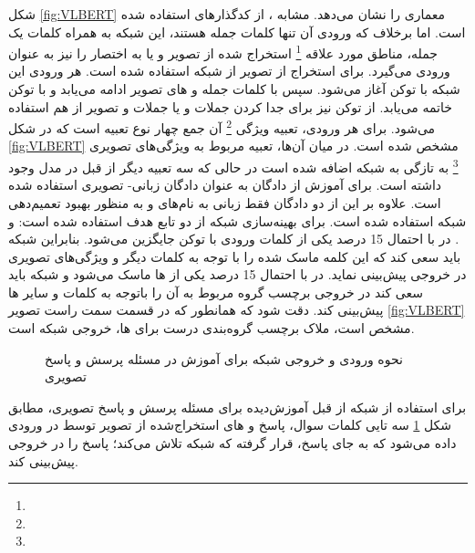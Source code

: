 	شکل
	\ref{fig:VLBERT}
	معماری 
		را نشان می‌دهد. مشابه 
	، از کدگذارهای
	استفاده شده است. اما برخلاف 
	که ورودی آن تنها کلمات جمله هستند، این شبکه به همراه کلمات یک جمله، مناطق مورد علاقه
	\footnote{}
	استخراج شده از تصویر و یا به اختصار
	را نیز به عنوان ورودی می‌گیرد. برای استخراج 
	از تصویر از شبکه 
	\cite{ren2015faster}
	استفاده شده است. هر ورودی این شبکه با توکن 
	\lr{[CLS]}
	آغاز می‌شود. سپس با کلمات جمله و 
	های تصویر ادامه می‌یابد و با توکن
	\lr{[END]}
	خاتمه می‌یابد. از توکن 
	\lr{[SEP]}
	نیز برای جدا کردن جملات و یا جملات و تصویر از هم استفاده می‌شود. برای هر ورودی، تعبیه ویژگی
	\footnote{}
	 آن جمع چهار نوع تعبیه است که در شکل 
	\ref{fig:VLBERT}
	 مشخص شده است. در میان آن‌ها، تعبیه مربوط به ویژگی‌های تصویری 
	\footnote{}
	 به تازگی به شبکه اضافه شده است در حالی که سه تعبیه دیگر از قبل در  مدل 
	 وجود داشته است. برای آموزش
	از  دادگان
	به عنوان ‌دادگان زبانی- تصویری استفاده شده است. علاوه بر این از دو ‌دادگان فقط زبانی به نام‌های 
	و 
	به منظور بهبود تعمیم‌دهی شبکه استفاده شده است. برای بهینه‌سازی شبکه 
	از دو تابع هدف استفاده شده است: 
	و
	.
	در
	با احتمال 15 درصد یکی از کلمات ورودی با توکن
	\lr{[MASK]}
	جایگزین می‌شود. بنابراین شبکه باید سعی کند که این کلمه ماسک شده را با توجه به کلمات دیگر و ویژگی‌های تصویری در خروجی پیش‌بینی نماید. در 
	با احتمال 15 درصد یکی از 
	ها ماسک ‌می‌شود و شبکه باید سعی کند در خروجی برچسب گروه مربوط به آن 
	را باتوجه به کلمات و سایر 
	ها پیش‌بینی کند. دقت شود که همانطور که در قسمت سمت راست تصویر
	\ref{fig:VLBERT}
	مشخص است، ملاک برچسب گروه‌بندی درست برای
	ها، خروجی شبکه
	است. 
	\begin{figure}
		\caption[نحوه ورودی و خروجی شبکه برای آموزش در مسئله پرسش و پاسخ تصویری]{نحوه ورودی و خروجی شبکه برای آموزش در مسئله پرسش و پاسخ تصویری\cite{su2019vl}}
		\label{fig:VLBERT-finetuning}
	\end{figure}
	برای استفاده از شبکه از قبل آموزش‌دیده
	برای مسئله پرسش و پاسخ تصویری، مطابق شکل
	\ref{fig:VLBERT-finetuning}
	سه تایی کلمات سوال، پاسخ و 
	های استخراج‌شده از تصویر توسط
	در ورودی داده می‌شود که به جای پاسخ،
	\lr{[MASK]}
	قرار گرفته که شبکه تلاش می‌کند؛ پاسخ را در خروجی پیش‌بینی کند.

